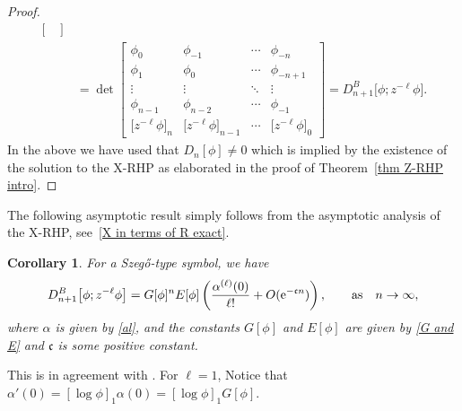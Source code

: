 \documentclass[10pt,a4paper]{amsart}
\numberwithin{equation}{section}
\newtheorem{Corollary}[Theorem]{Corollary}
\newcommand{\al}{\alpha}
\newcommand{\qasq}{\qquad \text{as} \quad}
\begin{document}
\begin{proof}
\begin{equation*}
\begin{split}
\begin{bmatrix}
				\end{bmatrix} \\ & = \det \begin{bmatrix}
					\phi_0 & \phi_{-1} & \cdots & \phi_{-n} \\
					\phi_1 & \phi_{0} & \cdots & \phi_{-n+1} \\
					\vdots & \vdots & \ddots & \vdots \\
					\phi_{n-1} & \phi_{n-2} & \cdots & \phi_{-1} \\
					\big[z^{-\ell}\phi\big]_n & \big[z^{-\ell}\phi\big]_{n-1} & \cdots & \big[z^{-\ell}\phi\big]_0
				\end{bmatrix} = D^B_{n+1}\big[\phi;z^{-\ell}\phi\big].
			\end{split}
		\end{equation*}
		In the above we have used that $D_n[\phi] \neq 0$ which is implied by the existence of the solution to the X-RHP as elaborated in the proof of Theorem~\ref{thm Z-RHP intro}.
	\end{proof}

	The following asymptotic result simply follows from the asymptotic analysis of the X-RHP, see~\eqref{X in terms of R exact}.
	
	\begin{Corollary}\label{Cor phi z^{-l}phi}
		For a Szeg\H{o}-type symbol, we have
		\begin{equation*}
			D^B_{n+1}\big[\phi;z^{-\ell}\phi\big] = G[\phi]^{n} E[\phi] \left( \frac{\al^{(\ell)}(0)}{\ell!} + O({\rm e}^{-\mathfrak{c}n}) \right), \qasq n \to \infty,
		\end{equation*}
		where $\al$ is given by \eqref{al}, and the constants $G[\phi]$ and $E[\phi]$ are given by \eqref{G and E} and $\mathfrak{c}$ is some positive constant.
	\end{Corollary}	
	
	
	
	\begin{Remark}
		\normalfont This is in agreement with \cite[Lemma 2.7]{BEGIL}. For $\ell=1$, Notice that $\al'(0)= [\log \phi]_1 \al(0) = [\log \phi]_1 G[\phi]$.
	\end{Remark}
	
\end{document}
